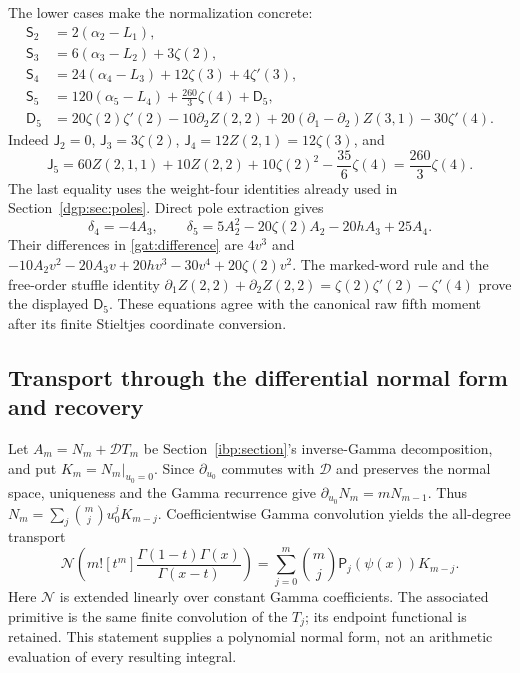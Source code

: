 The lower cases make the normalization concrete:
\begin{align*}
 \mathsf S_2&=2(\alpha_2-L_1),\\
 \mathsf S_3&=6(\alpha_3-L_2)+3\zeta(2),\\
 \mathsf S_4&=24(\alpha_4-L_3)+12\zeta(3)+4\zeta'(3),\\
 \mathsf S_5&=120(\alpha_5-L_4)+\frac{260}{3}\zeta(4)+\mathsf D_5,\\
 \mathsf D_5&=20\zeta(2)\zeta'(2)-10\partial_2Z(2,2)
       +20(\partial_1-\partial_2)Z(3,1)-30\zeta'(4).
\end{align*}
Indeed $\mathsf J_2=0$, $\mathsf J_3=3\zeta(2)$,
$\mathsf J_4=12Z(2,1)=12\zeta(3)$, and
\[
 \mathsf J_5=60Z(2,1,1)+10Z(2,2)+10\zeta(2)^2-\frac{35}{6}\zeta(4)
             =\frac{260}{3}\zeta(4).
\]
The last equality uses the weight-four identities already used in
Section~\ref{dgp:sec:poles}.  Direct pole extraction gives
\[
 \delta_4=-4A_3,\qquad
 \delta_5=5A_2^2-20\zeta(2)A_2-20hA_3+25A_4.
\]
Their differences in \eqref{gat:difference} are
$4v^3$ and
$-10A_2v^2-20A_3v+20hv^3-30v^4+20\zeta(2)v^2$.
The marked-word rule and the free-order stuffle identity
$\partial_1Z(2,2)+\partial_2Z(2,2)=\zeta(2)\zeta'(2)-\zeta'(4)$
prove the displayed $\mathsf D_5$.  These equations agree with the
canonical raw fifth moment after its finite Stieltjes coordinate conversion.

\subsection{Transport through the differential normal form and recovery}

Let $A_m=N_m+\mathcal DT_m$ be Section~\ref{ibp:section}'s
inverse-Gamma decomposition, and put $K_m=N_m|_{u_0=0}$.
Since $\partial_{u_0}$ commutes with $\mathcal D$ and preserves the
normal space, uniqueness and the Gamma recurrence give
$\partial_{u_0}N_m=mN_{m-1}$.  Thus
$N_m=\sum_j\binom mj u_0^jK_{m-j}$.
Coefficientwise Gamma convolution yields the all-degree transport
\[
 \mathcal N\!\left(m![t^m]\frac{\Gamma(1-t)\Gamma(x)}{\Gamma(x-t)}\right)
                  =\sum_{j=0}^m\binom mj\mathsf P_j(\psi(x))K_{m-j}.
\]
Here $\mathcal N$ is extended linearly over constant Gamma coefficients.
The associated primitive is the same finite convolution of the $T_j$;
its endpoint functional is retained.  This statement supplies a polynomial
normal form, not an arithmetic evaluation of every resulting integral.

